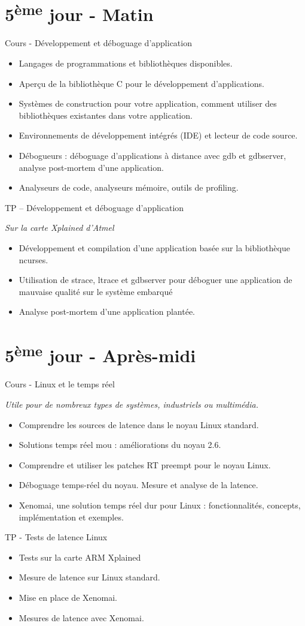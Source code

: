 \documentclass[a4paper,12pt,obeyspaces,spaces,hyphens]{article}
\begin{document}
\section{5\textsuperscript{ème} jour - Matin}

\feagendaonecolumn
{Cours - Développement et déboguage d'application}
{
  \begin{itemize}
  \item Langages de programmations et bibliothèques disponibles.
  \item Aperçu de la bibliothèque C pour le développement d'applications.
  \item Systèmes de construction pour votre application, comment utiliser des
	bibliothèques existantes dans votre application.
  \item Environnements de développement intégrés (IDE) et lecteur de code source.
  \item Débogueurs : déboguage d'applications à distance avec gdb et gdbserver, analyse
	post-mortem d'une application.
  \item Analyseurs de code, analyseurs mémoire, outils de profiling.
  \end{itemize}
}

\feagendaonecolumn
{TP – Développement et déboguage d'application}
{
  {\em Sur la carte Xplained d'Atmel}
  \begin{itemize}
  \item Développement et compilation d'une application basée sur la bibliothèque
	ncurses.
  \item Utilisation de strace, ltrace et gdbserver pour déboguer une application de
	mauvaise qualité sur le système embarqué
  \item Analyse post-mortem d'une application plantée.
  \end{itemize}
}


\section{5\textsuperscript{ème} jour - Après-midi}

\feagendaonecolumn
{Cours - Linux et le temps réel}
{
  {\em Utile pour de nombreux types de systèmes, industriels ou multimédia.}
  \begin{itemize}
  \item Comprendre les sources de latence dans le noyau Linux standard.
  \item Solutions temps réel mou : améliorations du noyau 2.6.
  \item Comprendre et utiliser les patches RT preempt pour le noyau Linux.
  \item Déboguage temps-réel du noyau. Mesure et analyse de la latence.
  \item Xenomai, une solution temps réel dur pour Linux : fonctionnalités, concepts,
	implémentation et exemples.
  \end{itemize}
}

\feagendaonecolumn
{TP - Tests de latence Linux}
{
  \begin{itemize}
  \item Tests sur la carte ARM Xplained
  \item Mesure de latence sur Linux standard.
  \item Mise en place de Xenomai.
  \item Mesures de latence avec Xenomai.
  \end{itemize}
}
\end{document}
